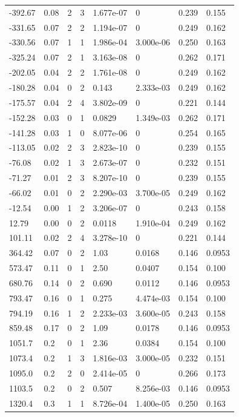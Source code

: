 \documentclass[preview]{standalone}
\begin{document}
{{\begin{tabular}{L{1.2cm}C{1.2cm} C{0.3cm}C{0.5cm} C{1.4cm}C{1.4cm} C{1.4cm}C{1.4cm}}
  -392.67  &  0.08  & 2     &  3 &  1.677e-07  & 0  & 0.239 &  0.155   \\ 
  -331.65  &  0.07  & 2     &  2 &  1.194e-07  & 0  & 0.249 &  0.162   \\ 
  -330.56  &  0.07  & 1     &  1 &  1.986e-04  & 3.000e-06  & 0.250 &  0.163   \\ 
  -325.24  &  0.07  & 2     &  1 &  3.163e-08  & 0  & 0.262 &  0.171   \\ 
  -202.05  &  0.04  & 2     &  2 &  1.761e-08  & 0  & 0.249 &  0.162   \\ 
  -180.28  &  0.04  & 0     &  2 &  0.143  & 2.333e-03  & 0.249 &  0.162   \\ 
  -175.57  &  0.04  & 2     &  4 &  3.802e-09  & 0  & 0.221 &  0.144   \\ 
  -152.28  &  0.03  & 0     &  1 &  0.0829  & 1.349e-03  & 0.262 &  0.171   \\ 
  -141.28  &  0.03  & 1     &  0 &  8.077e-06  & 0  & 0.254 &  0.165   \\ 
  -113.05  &  0.02  & 2     &  3 &  2.823e-10  & 0  & 0.239 &  0.155   \\ 
  -76.08  &  0.02  & 1     &  3 &  2.673e-07  & 0  & 0.232 &  0.151   \\ 
  -71.27  &  0.01  & 2     &  3 &  8.207e-10  & 0  & 0.239 &  0.155   \\ 
  -66.02  &  0.01  & 0     &  2 &  2.290e-03  & 3.700e-05  & 0.249 &  0.162   \\ 
  -12.54  &  0.00  & 1     &  2 &  3.206e-07  & 0  & 0.243 &  0.158   \\ 
  12.79  &  0.00  & 0     &  2 &  0.0118  & 1.910e-04  & 0.249 &  0.162   \\ 
  101.11  &  0.02  & 2     &  4 &  3.278e-10  & 0  & 0.221 &  0.144   \\ 
  364.42  &  0.07  & 0     &  2 &  1.03  & 0.0168  & 0.146 &  0.0953   \\ 
  573.47  &  0.11  & 0     &  1 &  2.50  & 0.0407  & 0.154 &  0.100   \\ 
  680.76  &  0.14  & 0     &  2 &  0.690  & 0.0112  & 0.146 &  0.0953   \\ 
  793.47  &  0.16  & 0     &  1 &  0.275  & 4.474e-03  & 0.154 &  0.100   \\ 
  794.19  &  0.16  & 1     &  2 &  2.233e-03  & 3.600e-05  & 0.243 &  0.158   \\ 
  859.48  &  0.17  & 0     &  2 &  1.09  & 0.0178  & 0.146 &  0.0953   \\ 
  1051.7  &   0.2  & 0     &  1 &  2.36  & 0.0384  & 0.154 &  0.100   \\ 
  1073.4  &   0.2  & 1     &  3 &  1.816e-03  & 3.000e-05  & 0.232 &  0.151   \\ 
  1095.0  &   0.2  & 2     &  0 &  2.414e-05  & 0  & 0.266 &  0.173   \\ 
  1103.5  &   0.2  & 0     &  2 &  0.507  & 8.256e-03  & 0.146 &  0.0953   \\ 
  1320.4  &   0.3  & 1     &  1 &  8.726e-04  & 1.400e-05  & 0.250 &  0.163   \\ 
\hline 
\end{tabular} 

}}
\end{document}
